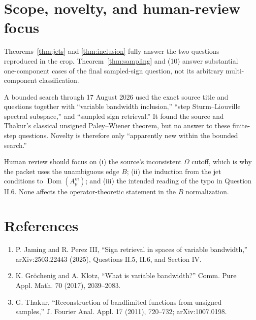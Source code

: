 \documentclass[11pt]{article}
\newcommand{\Dom}{\operatorname{Dom}}
\begin{document}
\section*{Scope, novelty, and human-review focus}

Theorems~\ref{thm:jets} and \ref{thm:inclusion} fully answer the two questions
reproduced in the crop.  Theorem~\ref{thm:sampling} and (10) answer substantial
one-component cases of the final sampled-sign question, not its arbitrary
multi-component classification.

A bounded search through 17 August 2026 used the exact source title and
questions together with ``variable bandwidth inclusion,'' ``step
Sturm--Liouville spectral subspace,'' and ``sampled sign retrieval.''  It
found the source and Thakur's classical unsigned Paley--Wiener theorem, but no
answer to these finite-step questions.  Novelty is therefore only
``apparently new within the bounded search.''

Human review should focus on (i) the source's inconsistent $\Omega$ cutoff,
which is why the packet uses the unambiguous edge $B$; (ii) the induction from
the jet conditions to $\Dom(A_p^m)$; and (iii) the intended reading of the
typo in Question II.6.  None affects the operator-theoretic statement in the
$B$ normalization.

\section*{References}

\begin{enumerate}
\item P. Jaming and R. Perez III, ``Sign retrieval in spaces of variable
  bandwidth,'' arXiv:2503.22443 (2025), Questions II.5, II.6, and Section IV.
\item K. Gr\"ochenig and A. Klotz, ``What is variable bandwidth?''
  Comm. Pure Appl. Math. 70 (2017), 2039--2083.
\item G. Thakur, ``Reconstruction of bandlimited functions from unsigned
  samples,'' J. Fourier Anal. Appl. 17 (2011), 720--732;
  arXiv:1007.0198.
\end{enumerate}
\end{document}
